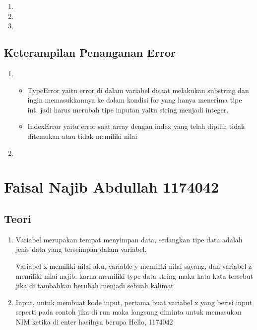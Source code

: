 \begin{enumerate}
\begin{enumerate}
	\item 

	\item 
	
	\item 
\end{enumerate}
\subsection{Keterampilan Penanganan Error}
\begin{enumerate}
	\item \begin{itemize} 
		\item TypeError yaitu error di dalam variabel disaat melakukan substring dan ingin memasukkannya ke dalam kondisi for 
	yang hanya menerima tipe int. jadi harus merubah tipe inputan yaitu string menjadi integer.
		\item IndexError yaitu error saat array dengan index yang telah dipilih tidak ditemukan atau tidak memiliki nilai
		\end{itemize}

	\item 
\end{enumerate}

\section{Faisal Najib Abdullah 1174042}
\subsection{Teori}
\begin{enumerate}
	\item Variabel merupakan tempat menyimpan data, sedangkan tipe data adalah jenis data yang terseimpan dalam variabel.
	
	Variabel x memiliki nilai aku, variable y memiliki nilai sayang, dan variabel z memiliki nilai najib. karna memiliki type data string maka kata kata tersebut jika di tambahkan berubah menjadi sebuah kalimat
	
	\item Input, untuk membuat kode input, pertama buat variabel x yang berisi input seperti pada contoh jika di run maka langsung diminta untuk memasukan NIM ketika di enter hasilnya berupa Hello, 1174042
	
	

\end{enumerate}
\end{enumerate}

